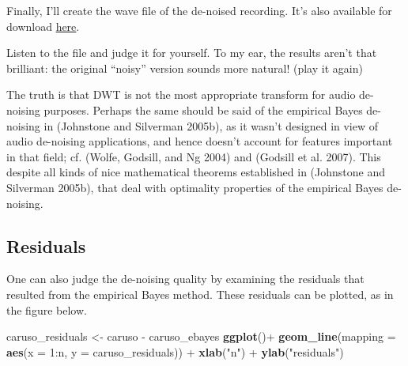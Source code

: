 \documentclass[]{tufte-handout}
\newenvironment{Shaded}{}{}
\newcommand{\KeywordTok}[1]{\textcolor[rgb]{0.00,0.44,0.13}{\textbf{#1}}}
\newcommand{\DataTypeTok}[1]{\textcolor[rgb]{0.56,0.13,0.00}{#1}}
\newcommand{\DecValTok}[1]{\textcolor[rgb]{0.25,0.63,0.44}{#1}}
\newcommand{\StringTok}[1]{\textcolor[rgb]{0.25,0.44,0.63}{#1}}
\newcommand{\OperatorTok}[1]{\textcolor[rgb]{0.40,0.40,0.40}{#1}}
\newcommand{\NormalTok}[1]{#1}
\begin{document}
Finally, I'll create the wave file of the de-noised recording. It's also
available for download \href{caruso_ebayes.wav}{here}.

\begin{Shaded}
\end{Shaded}

Listen to the file and judge it for yourself. To my ear, the results
aren't that brilliant: the original ``noisy'' version sounds more
natural! (play it again)

The truth is that DWT is not the most appropriate transform for audio
de-noising purposes. Perhaps the same should be said of the empirical
Bayes de-noising in (Johnstone and Silverman 2005b), as it wasn't
designed in view of audio de-noising applications, and hence doesn't
account for features important in that field; cf. (Wolfe, Godsill, and
Ng 2004) and (Godsill et al. 2007). This despite all kinds of nice
mathematical theorems established in (Johnstone and Silverman 2005b),
that deal with optimality properties of the empirical Bayes de-noising.

\subsection{Residuals}\label{residuals}

One can also judge the de-noising quality by examining the residuals
that resulted from the empirical Bayes method. These residuals can be
plotted, as in the figure below.

\begin{Shaded}
\begin{Highlighting}[]
\NormalTok{caruso_residuals <-}\StringTok{ }\NormalTok{caruso }\OperatorTok{-}\StringTok{ }\NormalTok{caruso_ebayes}
\KeywordTok{ggplot}\NormalTok{()}\OperatorTok{+}
\StringTok{  }\KeywordTok{geom_line}\NormalTok{(}\DataTypeTok{mapping =} \KeywordTok{aes}\NormalTok{(}\DataTypeTok{x =} \DecValTok{1}\OperatorTok{:}\NormalTok{n, }\DataTypeTok{y =}\NormalTok{ caruso_residuals)) }\OperatorTok{+}
\StringTok{  }\KeywordTok{xlab}\NormalTok{(}\StringTok{"n"}\NormalTok{) }\OperatorTok{+}
\StringTok{  }\KeywordTok{ylab}\NormalTok{(}\StringTok{"residuals"}\NormalTok{)}
\end{Highlighting}
\end{Shaded}
\end{document}
